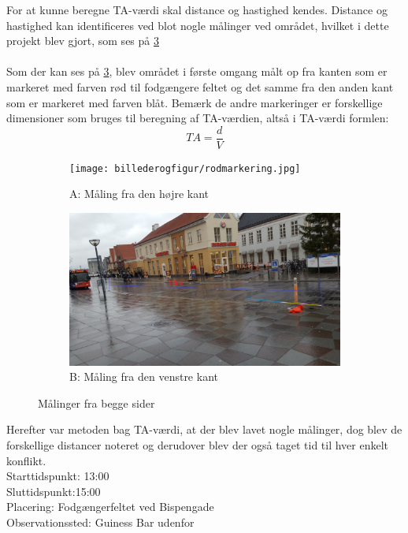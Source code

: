 For at kunne beregne TA-værdi skal distance og hastighed kendes. Distance og hastighed kan identificeres ved blot nogle målinger ved området, hvilket i dette projekt blev gjort, som ses på \cref{fig:maalingerfrabegge}
\\\\
Som der kan ses på \cref{fig:maalingerfrabegge}, blev området i første omgang målt op fra kanten som er markeret med farven rød til fodgængere feltet og det samme fra den anden kant som er markeret med farven blåt. Bemærk de andre markeringer er forskellige dimensioner som bruges til beregning af TA-værdien, altså i TA-værdi formlen:
$$ TA=\frac{d}{V} $$
\begin{figure}
\centering
\begin{subfigure}{1\textwidth}
  \centering
  \texttt{[image: billederogfigur/rodmarkering.jpg]}
  \caption{A: Måling fra den højre kant}
  \label{fig:obsomrrod}
\end{subfigure}
\begin{subfigure}{1\textwidth}
  \centering
  \includegraphics[width=1\linewidth]{billederogfigur/blaamarkering.jpg}
  \caption{B: Måling fra den venstre kant}
  \label{fig:obsomrblaa}
\end{subfigure}
\caption{Målinger fra begge sider}
\label{fig:maalingerfrabegge}
\end{figure}
Herefter var metoden bag TA-værdi, at der blev lavet nogle målinger, dog blev de forskellige distancer noteret og derudover blev der også taget tid til hver enkelt konflikt.\\
Starttidspunkt: 13:00
\\
Sluttidspunkt:15:00
\\
Placering: Fodgængerfeltet ved Bispengade
\\
Observationssted: Guiness Bar udenfor
\\
